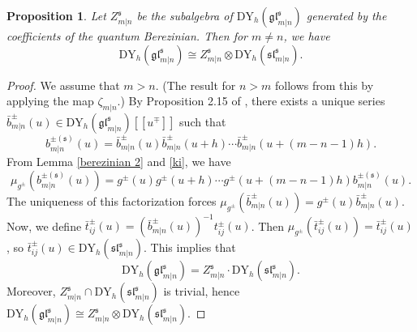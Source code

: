 \documentclass[a4paper,12pt]{article}
\newtheorem{prop}[theo]{Proposition}
\numberwithin{equation}{section}
\begin{document}
\begin{prop}
Let $Z^{\mathfrak{s}}_{m|n}$ be the subalgebra of $\mathrm{DY}_{h}(\mathfrak{gl}^{\mathfrak{s}}_{m|n})$ generated by the coefficients of the quantum Berezinian. Then for $m\neq n$, we have
$$
\mathrm{DY}_{h}(\mathfrak{gl}^{\mathfrak{s}}_{m|n})\cong Z^{\mathfrak{s}}_{m|n} \otimes \mathrm{DY}_{h}(\mathfrak{sl}^{\mathfrak{s}}_{m|n}).
$$
\end{prop}
\begin{proof}
We assume that $m>n$. (The result for $n>m$ follows from this by applying the map $\zeta_{m|n}$.) By Proposition 2.15  of \cite{MNO96}, there exists a unique series $\bar{b}_{m|n}^{\pm }(u)\in\mathrm{DY}_{h}(\mathfrak{gl}^{\mathfrak{s}}_{m|n})[[u^{\mp}]]$ such that
$$
b_{m|n}^{\pm (\mathfrak{s})}(u)=\bar{b}_{m|n}^{\pm }(u)\bar{b}_{m|n}^{\pm}(u+h)\cdots \bar{b}_{m|n}^{\pm}(u+(m-n-1)h).
$$
From Lemma \ref{berezinian 2} and \eqref{ki}, we have
$$
\mu_{g^{\pm}}\left(b_{m|n}^{\pm (\mathfrak{s})}(u)\right)=g^{\pm}(u)g^{\pm}(u+h)\cdots g^{\pm}(u+(m-n-1)h)b_{m|n}^{\pm (\mathfrak{s})}(u).
$$
The uniqueness of this factorization forces $\mu_{g^{\pm}}\left(\bar{b}_{m|n}^{\pm}(u)\right)=g^{\pm}(u) \bar{b}_{m|n}^{\pm}(u)$. Now, we define $\bar{t}_{ij}^{\pm}(u)=\left(\bar{b}_{m|n}^{\pm}(u)
\right)^{-1}t_{ij}^{\pm}(u)$. Then $\mu_{g^{\pm}}\left(\bar{t}_{ij}^{\pm}(u)
\right)=\bar{t}_{ij}^{\pm}(u)$, so $\bar{t}_{ij}^{\pm}(u)\in \mathrm{DY}_{h}(\mathfrak{sl}^{\mathfrak{s}}_{m|n})$. This implies that
$$
\mathrm{DY}_{h}(\mathfrak{gl}^{\mathfrak{s}}_{m|n})= Z^{\mathfrak{s}}_{m|n} \cdot \mathrm{DY}_{h}(\mathfrak{sl}^{\mathfrak{s}}_{m|n}).
$$
Moreover,
$Z^{\mathfrak{s}}_{m|n} \cap\mathrm{DY}_{h}(\mathfrak{sl}^{\mathfrak{s}}_{m|n})$ is trivial, hence $\mathrm{DY}_{h}(\mathfrak{gl}^{\mathfrak{s}}_{m|n})\cong Z^{\mathfrak{s}}_{m|n} \otimes \mathrm{DY}_{h}(\mathfrak{sl}^{\mathfrak{s}}_{m|n})$.
\end{proof}
\end{document}

